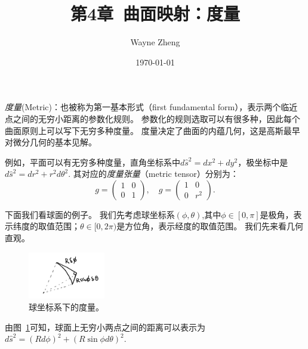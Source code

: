 \documentclass{article}
\title{第4章~曲面映射：度量}
\author{Wayne Zheng}
\date{\today}
\begin{document}
\maketitle

\emph{度量}(Metric)：也被称为第一基本形式（first fundamental form），表示两个临近点之间的无穷小距离的参数化规则。
参数化的规则选取可以有很多种，因此每个曲面原则上可以写下无穷多种度量。
度量决定了曲面的内蕴几何，这是高斯最早对微分几何的基本见解。

例如，平面可以有无穷多种度量，直角坐标系中$d\hat{s}^{2}=dx^{2}+dy^{2}$，极坐标中是$d\hat{s}^{2}=dr^{2}+r^{2}d\theta^{2}$.
其对应的\emph{度量张量}（metric tensor）分别为：
\begin{equation}
g=
\begin{pmatrix}
1 & 0 \\
0 & 1
\end{pmatrix}, \quad
g=
\begin{pmatrix}
1 & 0 \\
0 & r^{2}
\end{pmatrix}.
\end{equation}

下面我们看球面的例子。
我们先考虑球坐标系$(\phi, \theta)$,其中$\phi\in[0, \pi]$是极角，表示纬度的取值范围；$\theta\in[0, 2\pi)$是方位角，表示经度的取值范围。
我们先来看几何直观。

\begin{figure}[htbp]
    \centering %
    \includegraphics[width=0.3\textwidth]{../figs/chap4_01.jpg} %
    \caption{球坐标系下的度量。} 
    \label{fig:chap4_01} 
\end{figure}

由图~\ref{fig:chap4_01}可知，球面上无穷小两点之间的距离可以表示为$d\hat{s}^{2}=\left(Rd\phi\right)^{2}+\left(R\sin\phi{d}\theta\right)^{2}$.
\end{document}
